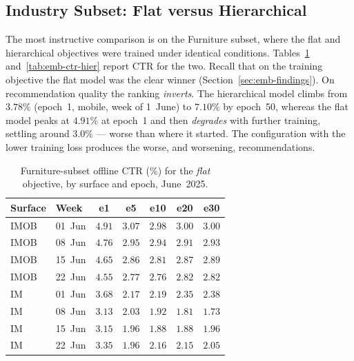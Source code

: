 \subsection{Industry Subset: Flat versus Hierarchical}
\label{sec:emb-industry-ctr}
The most instructive comparison is on the Furniture subset, where the flat and
hierarchical objectives were trained under identical conditions.
Tables~\ref{tab:emb-ctr-flat} and~\ref{tab:emb-ctr-hier} report CTR for the two.
Recall that on the training objective the flat model was the clear winner
(Section~\ref{sec:emb-findings}). On recommendation quality the ranking
\emph{inverts}. The hierarchical model climbs from $3.78\%$ (epoch~1, mobile,
week of 1~June) to $7.10\%$ by epoch~50, whereas the flat model peaks at
$4.91\%$ at epoch~1 and then \emph{degrades} with further training, settling
around $3.0\%$ --- worse than where it started. The configuration with the lower
training loss produces the worse, and worsening, recommendations.

\begin{table}[ht]
  \centering
  \caption{Furniture-subset offline CTR (\%) for the \emph{flat} objective, by
           surface and epoch, June~2025.}
  \label{tab:emb-ctr-flat}
  \small
  \begin{tabular}{llccccc}
    \toprule
    Surface & Week & e1 & e5 & e10 & e20 & e30 \\
    \midrule
    IMOB & 01~Jun & $4.91$ & $3.07$ & $2.98$ & $3.00$ & $3.00$ \\
    IMOB & 08~Jun & $4.76$ & $2.95$ & $2.94$ & $2.91$ & $2.93$ \\
    IMOB & 15~Jun & $4.65$ & $2.86$ & $2.81$ & $2.87$ & $2.89$ \\
    IMOB & 22~Jun & $4.55$ & $2.77$ & $2.76$ & $2.82$ & $2.82$ \\
    \midrule
    IM   & 01~Jun & $3.68$ & $2.17$ & $2.19$ & $2.35$ & $2.38$ \\
    IM   & 08~Jun & $3.13$ & $2.03$ & $1.92$ & $1.81$ & $1.73$ \\
    IM   & 15~Jun & $3.15$ & $1.96$ & $1.88$ & $1.88$ & $1.96$ \\
    IM   & 22~Jun & $3.35$ & $1.96$ & $2.16$ & $2.15$ & $2.05$ \\
    \bottomrule
  \end{tabular}
\end{table}

